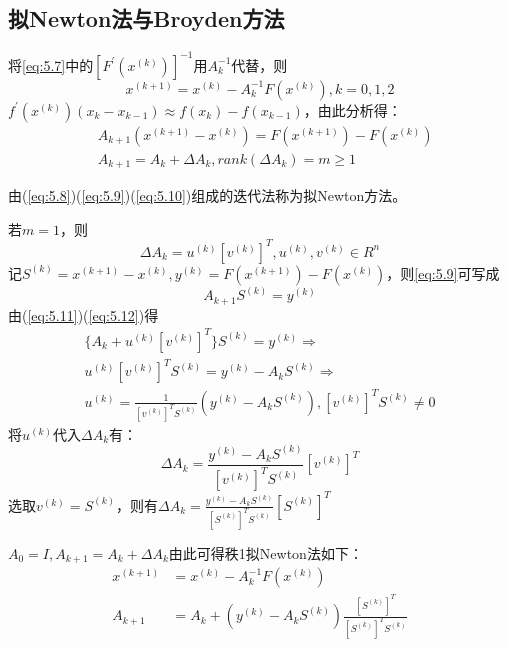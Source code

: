 \documentclass[a4paper]{article}
\begin{document}
\subsection{拟Newton法与Broyden方法}
将\ref{eq:5.7}中的$[F^{'}(x^{(k)})]^{-1} $用$A_k^{-1} $代替，则
\begin{equation}
    x^{(k+1)}=x^{(k)}-A_k^{-1}F(x^{(k)}), k=0,1,2
    \label{eq:5.8}
\end{equation}
$f^{'}(x^{(k)})(x_k-x_{k-1})\approx f(x_k)-f(x_{k-1}) $，由此分析得：
\begin{align}
    &A_{k+1}(x^{(k+1)}-x^{(k)})=F(x^{(k+1)})-F(x^{(k)}) \label{eq:5.9}\\
    &A_{k+1} = A_k+\Delta A_k, rank(\Delta A_k)=m\ge 1 \label{eq:5.10}
\end{align}

由(\ref{eq:5.8})(\ref{eq:5.9})(\ref{eq:5.10})组成的迭代法称为拟Newton方法。

若$m=1$，则
\begin{equation}
    \Delta A_k=u^{(k)}[v^{(k)}]^T, u^{(k)},v^{(k)}\in R^n 
    \label{eq:5.11}
\end{equation}
记$S^{(k)}=x^{(k+1)}-x^{(k)}, y^{(k)}=F(x^{(k+1)})-F(x^{(k)}) $，则\ref{eq:5.9}可写成
\begin{equation}
    A_{k+1}S^{(k)}=y^{(k)} 
    \label{eq:5.12}
\end{equation}
由(\ref{eq:5.11})(\ref{eq:5.12})得
\begin{equation*}
    \begin{array}{lr}
        \{A_k+u^{(k)}[v^{(k)}]^T \}S^{(k)}=y^{(k)} \Rightarrow \\
        u^{(k)}[v^{(k)}]^TS^{(k)} = y^{(k)}-A_kS^{(k)} \Rightarrow \\
        u^{(k)} = \frac{1}{[v^{(k)}]^TS^{(k)}}(y^{(k)}-A_kS^{(k)}), [v^{(k)}]^TS^{(k)}\neq 0
    \end{array}
\end{equation*}
将$u^{(k)}$代入$\Delta A_k$有：
$$\Delta A_k = \frac{y^{(k)}-A_kS^{(k)}}{[v^{(k)}]^TS^{(k)}}[v^{(k)}]^T$$
选取$v^{(k)}=S^{(k)} $，则有$\Delta A_k = \frac{y^{(k)}-A_kS^{(k)}}{[S^{(k)}]^TS^{(k)}}[S^{(k)}]^T$

$A_0=I, A_{k+1}=A_k+\Delta A_k $由此可得秩1拟Newton法如下：
\begin{align}
    x^{(k+1)}&=x^{(k)}-A^{-1}_kF(x^{(k)}) \\
    A_{k+1}&=A_k + (y^{(k)}-A_kS^{(k)})\frac{[S^{(k)}]^T}{[S^{(k)}]^TS^{(k)}}
\end{align}
\end{document}
